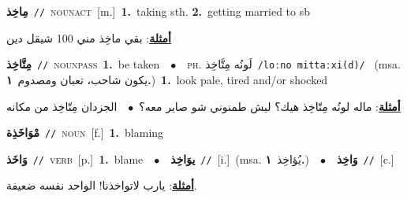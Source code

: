 \documentclass[10pt,a4paper,twoside]{article} %
\begin{document}
\begin{multicols}{2}
{{{{{{\setlength\topsep{0pt}\textbf{\foreignlanguage{arabic}{مِاخِذ}}\ {\color{gray}\texttt{//}\color{black}}\ \textsc{noun\textunderscore act}\ [m.]\ \textbf{1.}~taking sth.  \textbf{2.}~getting married to sb\  \begin{flushright}\color{gray}\foreignlanguage{arabic}{\textbf{\underline{\foreignlanguage{arabic}{أمثلة}}}: بقي ماخِذ مني 100 شيقل دين}\end{flushright}\color{black}} \vspace{2mm}

{\setlength\topsep{0pt}\textbf{\foreignlanguage{arabic}{مِتَّاخِذ}}\ {\color{gray}\texttt{//}\color{black}}\ \textsc{noun\textunderscore pass}\ \textbf{1.}~be taken\ \ $\bullet$\ \ \textsc{ph.} \color{gray} \foreignlanguage{arabic}{لَونُه مِتَّاخِذ}\color{black}\ {\color{gray}\texttt{/{\sffamily loːno mittaːxi(d)}/}\color{black}}\ \color{gray} (msa. \foreignlanguage{arabic}{يكون شاحب، تعبان ومصدوم}~\foreignlanguage{arabic}{\textbf{١.}})\color{black}\ \textbf{1.}~look pale, tired and/or shocked\  \begin{flushright}\color{gray}\foreignlanguage{arabic}{\textbf{\underline{\foreignlanguage{arabic}{أمثلة}}}: ماله لونُه مِتّاخِذ هيك؟ ليش طمنوني شو صاير معه؟\ $\bullet$\ \  الجزدان مِتّاخِذ من مكانه}\end{flushright}\color{black}} \vspace{2mm}

{\setlength\topsep{0pt}\textbf{\foreignlanguage{arabic}{مْوَاخَذِة}}\ {\color{gray}\texttt{//}\color{black}}\ \textsc{noun}\ [f.]\ \textbf{1.}~blaming\ 

{\setlength\topsep{0pt}\textbf{\foreignlanguage{arabic}{وَاخَذ}}\ {\color{gray}\texttt{//}\color{black}}\ \textsc{verb}\ [p.]\ \textbf{1.}~blame\ \ $\bullet$\ \ \setlength\topsep{0pt}\textbf{\foreignlanguage{arabic}{يوَاخِذ}}\ {\color{gray}\texttt{//}\color{black}}\ [i.]\ \color{gray}(msa. \foreignlanguage{arabic}{يُؤاخِذ}~\foreignlanguage{arabic}{\textbf{١.}})\color{black}\ \ $\bullet$\ \ \setlength\topsep{0pt}\textbf{\foreignlanguage{arabic}{وَاخِذ}}\ {\color{gray}\texttt{//}\color{black}}\ [c.]\  \begin{flushright}\color{gray}\foreignlanguage{arabic}{\textbf{\underline{\foreignlanguage{arabic}{أمثلة}}}: يارب لاتواخذنا! الواحد نفسه ضعيفة.}\end{flushright}\color{black}} \vspace{2mm}

}}}}}}
\end{multicols}
\end{document}
